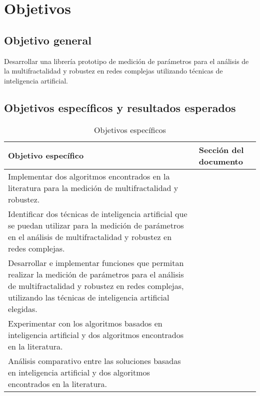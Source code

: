 \section{Objetivos}

\subsection{Objetivo general}

Desarrollar una librería prototipo de medición de parámetros para el análisis de la multifractalidad y robustez en redes complejas utilizando técnicas de inteligencia artificial.

\subsection{Objetivos espec\'ificos y resultados esperados}

\begin{table}[H]
    \centering
    \begin{tabular}{|p{11cm}|p{4cm}|}
        \hline
        \textbf{Objetivo específico} & \textbf{Sección del documento} \\
        \hline
        Implementar dos algoritmos encontrados en la literatura para la medición de multifractalidad y robustez.& \\
        \hline
        Identificar dos técnicas de inteligencia artificial que se puedan utilizar para la medición de parámetros en el análisis de multifractalidad y robustez en redes complejas.&  \\
        \hline
         Desarrollar e implementar funciones que
permitan realizar la medición de parámetros para el análisis de multifractalidad y robustez en redes complejas, utilizando las técnicas de inteligencia artificial elegidas. & \\
        \hline
         Experimentar con los algoritmos basados
en inteligencia artificial y dos algoritmos
encontrados en la literatura.&  \\
        \hline
        Análisis comparativo entre las soluciones basadas en inteligencia artificial y dos algoritmos encontrados en la literatura.  & \\
        \hline
    \end{tabular}
    \caption{Objetivos específicos}
    \label{tab:objEspecificos}
\end{table}







